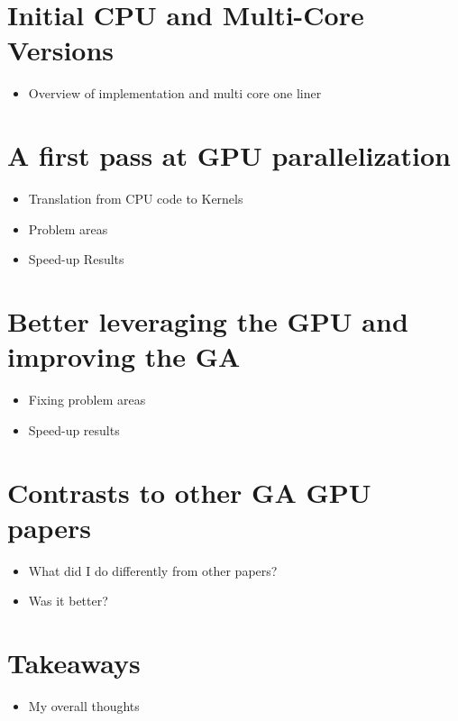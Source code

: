 \documentclass[11pt]{article}       %
\newenvironment{slide}[1]        {\section{#1} \begin{itemize}}%
                                 {\end{itemize}}
\begin{document}
\begin{slide}{Initial CPU and Multi-Core Versions}
\item Overview of implementation and multi core one liner
\end{slide}

\begin{slide}{A first pass at GPU parallelization}
\item Translation from CPU code to Kernels
\item Problem areas
\item Speed-up Results
\end{slide}

\begin{slide}{Better leveraging the GPU and improving the GA}
\item Fixing problem areas
\item Speed-up results
\end{slide}

\begin{slide}{Contrasts to other GA GPU papers}
\item What did I do differently from other papers?
\item Was it better?
\end{slide}

\begin{slide}{Takeaways}
\item My overall thoughts
\end{slide}



\end{document}
